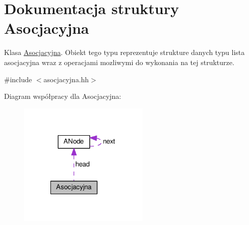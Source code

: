 \hypertarget{struct_asocjacyjna}{\section{Dokumentacja struktury Asocjacyjna}
\label{struct_asocjacyjna}
}


Klasa \hyperlink{struct_asocjacyjna}{Asocjacyjna}. Obiekt tego typu reprezentuje strukture danych typu lista asocjacyjna wraz z operacjami mozliwymi do wykonania na tej strukturze.  




{\ttfamily \#include $<$asocjacyjna.\-hh$>$}



Diagram współpracy dla Asocjacyjna\-:\nopagebreak
\begin{figure}[H]
\begin{center}
\leavevmode
\includegraphics[width=176pt]{struct_asocjacyjna__coll__graph}
\end{center}
\end{figure}
